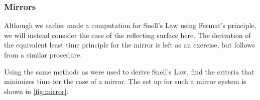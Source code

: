 \subsubsection{Mirrors}
Although we earlier made a computation for Snell's Law using Fermat's principle, we will instead consider the case of the reflecting surface here. The derivation of the equivalent least time principle for the mirror is left as an exercise, but follows from a similar procedure.

\begin{exercise}
    Using the same methods as were used to derive Snell's Law, find the criteria that minimizes time for the case of a mirror. The set up for such a mirror system is shown in \autoref{fig:mirror}.
\begin{figure}[H]
    \centering



\begin{tikzpicture}[x=0.75pt,y=0.75pt,yscale=-.6,xscale=.6]


\end{tikzpicture}
\end{figure}
\end{exercise}
